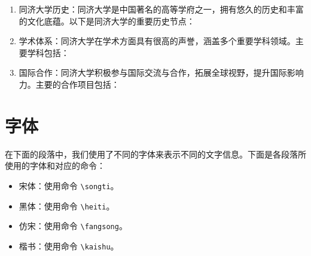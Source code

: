 \begin{enumerate}
    \item 同济大学历史：同济大学是中国著名的高等学府之一，拥有悠久的历史和丰富的文化底蕴。以下是同济大学的重要历史节点：
    \item 学术体系：同济大学在学术方面具有很高的声誉，涵盖多个重要学科领域。主要学科包括：
    \item 国际合作：同济大学积极参与国际交流与合作，拓展全球视野，提升国际影响力。主要的合作项目包括：
\end{enumerate}

\section{字体}

在下面的段落中，我们使用了不同的字体来表示不同的文字信息。下面是各段落所使用的字体和对应的命令：

\begin{itemize}
    \item {\songti 宋体}：使用命令 \texttt{\textbackslash songti}。
    \item {\heiti 黑体}：使用命令 \texttt{\textbackslash heiti}。
    \item {\fangsong 仿宋}：使用命令 \texttt{\textbackslash fangsong}。
    \item {\kaishu 楷书}：使用命令 \texttt{\textbackslash kaishu}。
\end{itemize}

